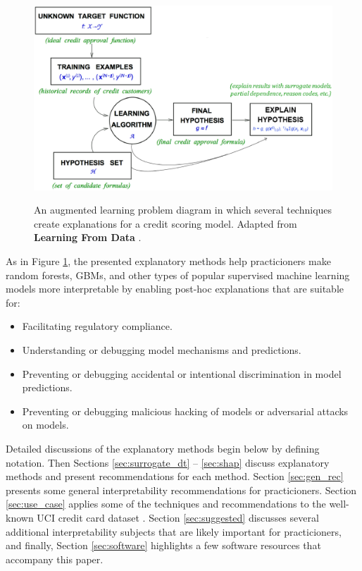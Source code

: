 \documentclass[11pt]{asaproc}
\begin{document}
\begin{figure}[htb]
	\begin{center}
		\includegraphics[scale=0.33]{img/figure_1.eps}
		\label{fig:learning_problem}
		\caption{An augmented learning problem diagram in which several techniques create explanations for a credit scoring model. Adapted from \textbf{Learning From Data} \cite{lfd}.}
	\end{center}
\end{figure}	
	
As in Figure \ref{fig:learning_problem}, the presented explanatory methods help practicioners make random forests, GBMs, and other types of popular supervised  machine learning models more interpretable by enabling post-hoc explanations that are suitable for:\\

\begin{itemize}
	\item Facilitating regulatory compliance.
	\item Understanding or debugging model mechanisms and predictions.
	\item Preventing or debugging accidental or intentional discrimination in model predictions.
	\item Preventing or debugging malicious hacking of models or adversarial attacks on models.
\end{itemize}

Detailed discussions of the explanatory methods begin below by defining notation. Then Sections \ref{sec:surrogate_dt} -- \ref{sec:shap} discuss explanatory methods and present recommendations for each method. Section \ref{sec:gen_rec} presents some general interpretability recommendations for practicioners. Section \ref{sec:use_case} applies some of the techniques and recommendations to the well-known UCI credit card dataset \cite{uci}. Section \ref{sec:suggested} discusses several additional interpretability subjects that are likely important for practicioners, and finally, Section \ref{sec:software} highlights a few software resources that accompany this paper. 
\end{document}
